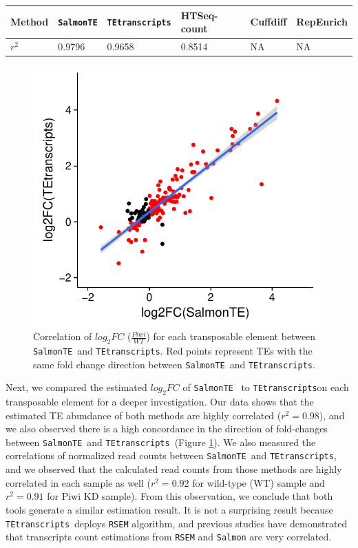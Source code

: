 \documentclass[wsdraft]{ws-procs11x85}
\newcommand{\TEtranscripts}{\texttt{TEtranscripts}}
\newcommand{\SalmonTE}{\texttt{SalmonTE}}
\begin{document}
\begin{table}[h]
{\begin{tabular}{l|lllll}
	\hline
	Method    & \SalmonTE & \TEtranscripts & HTSeq-count & Cuffdiff & RepEnrich  \\ \hline
	 $r^2$ & 0.9796 & 0.9658 & 0.8514 & NA & NA \\ \hline
\end{tabular}}\label{aba:table_corr}
\end{table}

\begin{figure}[h]
\centerline{
\includegraphics[width=11cm]{figure_corr_FC}
}
\caption{Correlation of $log_{2}FC$ ($\frac{Piwi}{WT}$) for each transposable element between \SalmonTE~and \TEtranscripts. Red points represent TEs with the same fold change direction between \SalmonTE~and \TEtranscripts.}
\label{aba:fig2}
\end{figure}

Next, we compared the estimated $log_{2}FC$ of \SalmonTE~ to \TEtranscripts on each transposable element for a deeper investigation. Our data shows that the estimated TE abundance of both methods are highly correlated ($r^{2}=0.98$), and we also observed there is a high concordance in the direction of fold-changes between \SalmonTE~and \TEtranscripts~(Figure \ref{aba:fig2}). We also measured the correlations of normalized read counts between \SalmonTE~and \TEtranscripts, 
and we observed that the calculated read counts from those methods are highly correlated in each sample as well ($r^2=0.92$ for wild-type (WT) sample and $r^2=0.91$ for Piwi KD sample).
From this observation, we conclude that both tools generate a similar estimation result. 
It is not a surprising result because \TEtranscripts~deploys \texttt{RSEM} algorithm,\cite{li2011rsem} and previous studies have demonstrated that transcripts count estimations from \texttt{RSEM} and \texttt{Salmon} are very correlated.\cite{jin2017comprehensive,zhang2017evaluation}
\end{document}
